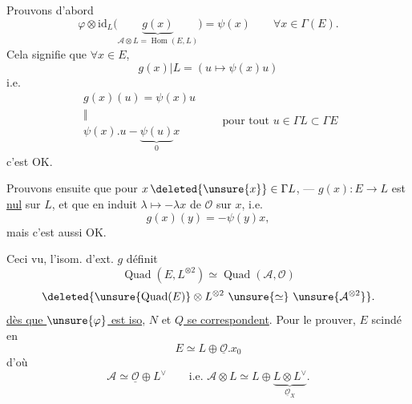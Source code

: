 
Prouvons d'abord
\[
\varphi\otimes\mathrm{id}_L\bigl(\underbrace{g(x)}_{\mathcal A\otimes L=\operatorname{Hom}(E,L)}\bigr)=\psi(x)\qquad \forall x\in\Gamma(E).
\]
Cela signifie que $\forall x\in E$,
\[
g(x)|L=(u\mapsto\psi(x)u)
\]
 i.e.
\[
\begin{array}{c}
g(x)(u)=\psi(x)u\\[-2pt]
\Vert\\[-2pt]
\psi(x).u-\underbrace{\psi(u)}_{0}x
\end{array}
\qquad\text{pour tout }u\in\Gamma L\subset\Gamma E
\]
c'est OK.

Prouvons ensuite que pour $x\,\deleted{\unsure{x}}\in\Gamma L$, ---
$g(x):E\longrightarrow L$ est \uline{nul} sur $L$, et que 
en  induit $\lambda\mapsto-\lambda x$ de $\mathcal O$ sur $x$,
i.e.
\[
g(x)(y)=-\psi(y)x,
\]
mais c'est aussi OK.

Ceci vu, l'isom. d'ext. $g$ définit
\[
\operatorname{Quad}(E,L^{\otimes2})\simeq\operatorname{Quad}(\mathcal A,\mathcal O)
\]
\[
\deleted{\unsure{\operatorname{Quad}(E)}\otimes L^{\otimes2}\ \unsure{\simeq}\ \unsure{\mathcal A^{\otimes2}}}.
\]
\uline{dès que $\unsure{\varphi}$ est iso}, \uline{$N$} et \uline{$Q$ se correspondent}.
Pour le prouver,  $E$ scindé en
\[
E\simeq L\oplus\underline{\mathcal O}.x_0
\]
d'où
\[
\mathcal A\simeq\underline{\mathcal O}\oplus L^\vee
\qquad\text{i.e. }\mathcal A\otimes L\simeq L\oplus\underbrace{L\otimes L^\vee}_{\underline{\mathcal O}_X}.
\]
